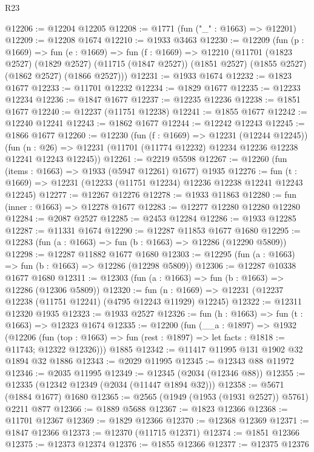 \begin{lexlean}{R23}
\begin{coremodule}
@12206 := @12204 @12205
@12208 := @1771 (fun ("_" : @1663) => @12201)
@12209 := @12208 @1674
@12210 := @1933 @3463
@12230 := @12209
    (fun (p : @1669) =>
    fun (e : @1669) =>
    fun (f : @1669) =>
    @12210
      (@11701
        (@1823 @2527)
        (@1829 @2527)
        (@11715 (@1847 @2527))
        (@1851 @2527)
        (@1855 @2527)
        (@1862 @2527)
        (@1866 @2527)))
@12231 := @1933 @1674
@12232 := @1823 @1677
@12233 := @11701 @12232
@12234 := @1829 @1677
@12235 := @12233 @12234
@12236 := @1847 @1677
@12237 := @12235 @12236
@12238 := @1851 @1677
@12240 := @12237 (@11751 @12238)
@12241 := @1855 @1677
@12242 := @12240 @12241
@12243 := @1862 @1677
@12244 := @12242 @12243
@12245 := @1866 @1677
@12260 := @12230
    (fun (f : @1669) => @12231 (@12244 @12245))
    (fun (n : @26) => @12231 (@11701 (@11774 @12232) @12234 @12236 @12238 @12241 @12243 @12245))
@12261 := @2219 @5598
@12267 := @12260 (fun (items : @1663) => @1933 (@5947 @12261) @1677) @1935
@12276 := fun (t : @1669) => @12231 (@12233 (@11751 @12234) @12236 @12238 @12241 @12243 @12245)
@12277 := @12267 @12276
@12278 := @1933 @11863
@12280 := fun (inner : @1663) => @12278 @1677
@12283 := @12277 @12280 @12280 @12280
@12284 := @2087 @2527
@12285 := @2453 @12284
@12286 := @1933 @12285
@12287 := @11331 @1674
@12290 := @12287 @11853 @1677 @1680
@12295 := @12283 (fun (a : @1663) => fun (b : @1663) => @12286 (@12290 @5809))
@12298 := @12287 @11882 @1677 @1680
@12303 := @12295 (fun (a : @1663) => fun (b : @1663) => @12286 (@12298 @5809))
@12306 := @12287 @10338 @1677 @1680
@12311 := @12303 (fun (a : @1663) => fun (b : @1663) => @12286 (@12306 @5809))
@12320 := fun (n : @1669) => @12231 (@12237 @12238 (@11751 @12241) (@4795 @12243 @11929) @12245)
@12322 := @12311 @12320 @1935
@12323 := @1933 @2527
@12326 := fun (h : @1663) => fun (t : @1663) => @12323 @1674
@12335 := @12200
    (fun (__a : @1897) =>
    @1932
      (@12206
        (fun (top : @1663) => fun (rest : @1897) => let facts : @1818 := @11743; @12322 @12326)))
    @1885
@12342 := @11417 @11995 @131 @1902 @32 @1894 @32 @1886
@12343 := @2029 @11995
@12345 := @12343 @88 @11972
@12346 := @2035 @11995
@12349 := @12345 (@2034 (@12346 @88))
@12355 := @12335 (@12342 @12349 (@2034 (@11447 @1894 @32)))
@12358 := @5671 (@1884 @1677) @1680
@12365 := @2565 (@1949 (@1953 (@1931 @2527)) @5761) @2211 @877
@12366 := @1889 @5688
@12367 := @1823 @12366
@12368 := @11701 @12367
@12369 := @1829 @12366
@12370 := @12368 @12369
@12371 := @1847 @12366
@12373 := @12370 (@11715 @12371)
@12374 := @1851 @12366
@12375 := @12373 @12374
@12376 := @1855 @12366
@12377 := @12375 @12376

\end{coremodule}
\end{lexlean}
